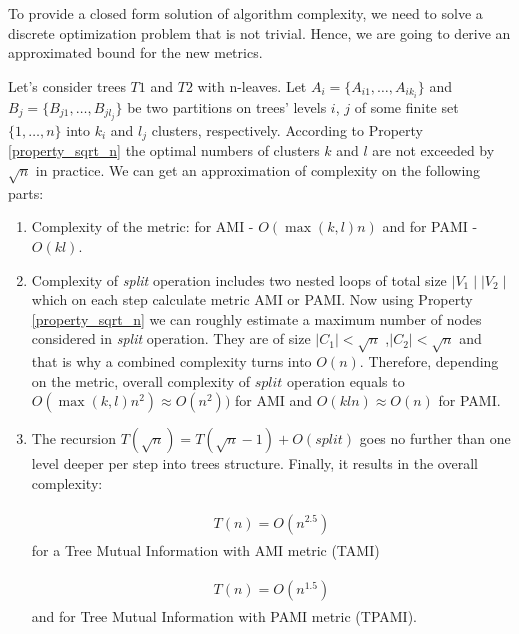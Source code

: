 

To provide a closed form solution of algorithm complexity, we need to solve a discrete optimization problem that is not trivial. Hence, we are going to derive an approximated bound for the new metrics.  

Let's consider trees $T1$ and $T2$ with n-leaves. Let $A_i = \{A_{i1},\ldots,A_{ik_i}\}$ and $B_j = \{B_{j1},\ldots,B_{jl_j}\}$ be two partitions on trees' levels $i$, $j$ of some finite set $\{1,\ldots,n\}$ into $k_i$ and $l_j$ clusters, respectively. According to Property \ref{property_sqrt_n} the optimal numbers of clusters $k$ and $l$ are not exceeded by $\sqrt{n}$ in practice. We can get an approximation of complexity on the following parts:

\begin{enumerate}
\item Complexity of the metric: for AMI - $O(\max(k,l)n)$ and for PAMI - $O(kl)$.
\item Complexity of \textit{split} operation includes two nested loops of total size $\mid V_1 \mid \mid V_2 \mid$ which on each step calculate metric AMI or PAMI. Now using Property \ref{property_sqrt_n} we can roughly estimate a maximum number of nodes considered in \textit{split} operation. They are of size $\mid C_1 \mid < \sqrt{n}$ ,$\mid C_2 \mid < \sqrt{n}$ and that is why a combined complexity turns into $O(n)$. Therefore, depending on the metric, overall complexity of $split$ operation equals to $O(\max(k,l)n^2) \approx O(n^2))$ for AMI and $O(kln) \approx O(n)$ for PAMI.
\item The recursion $T(\sqrt{n}) = T(\sqrt{n}-1) + O(split)$ goes no further than one level deeper per step into trees structure. Finally, it results in the overall complexity: 

\begin{align}
\begin{split}
T(n) = O(n^{2.5})
\end{split}
\label{eq:complexity TAMI}
\end{align}	
for a Tree Mutual Information with AMI metric (TAMI)  

\begin{align}
\begin{split}
T(n) = O(n^{1.5})
\end{split}
\label{eq:complexity TPAMI}
\end{align}	
and for Tree Mutual Information with PAMI metric (TPAMI).   
\end{enumerate}

